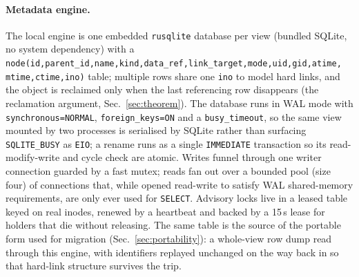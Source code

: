 \documentclass[numberedsection,acmtos]{acmart}
\begin{document}
\paragraph{Metadata engine.} The local engine is one embedded \texttt{rusqlite}
database per view (bundled SQLite, no system dependency) with a
\texttt{node(id,parent\_id,name,kind,data\_ref,link\_target,mode,uid,gid,atime,
mtime,ctime,ino)} table; multiple rows share one \texttt{ino} to model hard
links, and the object is reclaimed only when the last referencing row disappears
(the reclamation argument, Sec.~\ref{sec:theorem}). The database runs in WAL mode with
\texttt{synchronous=NORMAL}, \texttt{foreign\_keys=ON} and a
\texttt{busy\_timeout}, so the same view mounted by two processes is serialised
by SQLite rather than surfacing \texttt{SQLITE\_BUSY} as \texttt{EIO}; a rename
runs as a single \texttt{IMMEDIATE} transaction so its read-modify-write and
cycle check are atomic. Writes funnel through one writer connection guarded by a
fast mutex; reads fan out over a bounded pool (size four) of connections that,
while opened read-write to satisfy WAL shared-memory requirements, are only ever
used for \texttt{SELECT}. Advisory locks live in a leased table keyed on real
inodes, renewed by a heartbeat and backed by a 15\,s lease for holders that die
without releasing. The same table is the source of the portable form used for
migration (Sec.~\ref{sec:portability}): a whole-view row dump read through this
engine, with identifiers replayed unchanged on the way back in so that hard-link
structure survives the trip.
\end{document}
